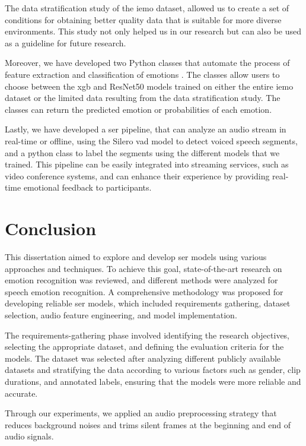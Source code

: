 The data stratification study of the \ac{iemo} dataset, allowed us to create a set of conditions for obtaining better quality data that is suitable for more diverse environments. This study not only helped us in our research but can also be used as a guideline for future research.

Moreover, we have developed two Python classes that automate the process of feature extraction and classification of emotions \cite{Mario_Silva_Speech_Emotion_Recognition_2023}. The classes allow users to choose between the \ac{xgb} and ResNet50 models trained on either the entire \ac{iemo} dataset or the limited data resulting from the data stratification study. The classes can return the predicted emotion or probabilities of each emotion.

Lastly, we have developed a \ac{ser} pipeline, that can analyze an audio stream in real-time or offline, using the Silero \ac{vad} model to detect voiced speech segments, and a python class to label the segments using the different models that we trained. This pipeline can be easily integrated into streaming services, such as video conference systems, and can enhance their experience by providing real-time emotional feedback to participants.

\section{Conclusion}

This dissertation aimed to explore and develop \ac{ser} models using various approaches and techniques. To achieve this goal, state-of-the-art research on emotion recognition was reviewed, and different methods were analyzed for speech emotion recognition. A comprehensive methodology was proposed for developing reliable \ac{ser} models, which included requirements gathering, dataset selection, audio feature engineering, and model implementation.

The requirements-gathering phase involved identifying the research objectives, selecting the appropriate dataset, and defining the evaluation criteria for the models. The dataset was selected after analyzing different publicly available datasets and stratifying the data according to various factors such as gender, clip durations, and annotated labels, ensuring that the models were more reliable and accurate.

Through our experiments, we applied an audio preprocessing strategy that reduces background noises and trims silent frames at the beginning and end of audio signals.

